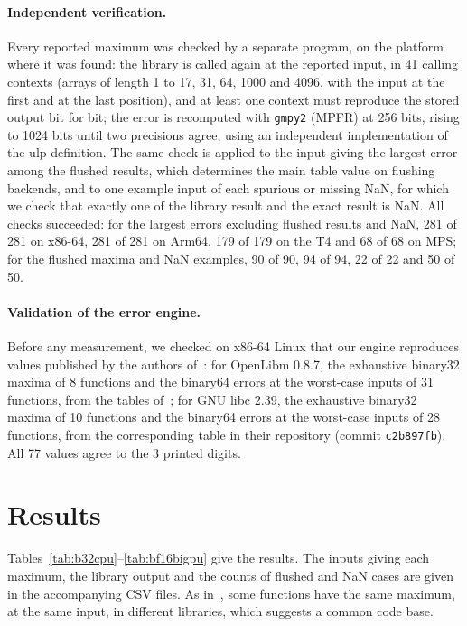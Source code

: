 \documentclass[11pt,a4paper]{article}
\begin{document}
\paragraph{Independent verification.} Every reported maximum was checked by a separate program, on the platform where it was found: the library is called again at the reported input, in 41 calling contexts (arrays of length 1 to 17, 31, 64, 1000 and 4096, with the input at the first and at the last position), and at least one context must reproduce the stored output bit for bit; the error is recomputed with \texttt{gmpy2} (MPFR) at 256 bits, rising to 1024 bits until two precisions agree, using an independent implementation of the ulp definition. The same check is applied to the input giving the largest error among the flushed results, which determines the main table value on flushing backends, and to one example input of each spurious or missing NaN, for which we check that exactly one of the library result and the exact result is NaN. All checks succeeded: for the largest errors excluding flushed results and NaN, 281 of 281 on x86-64, 281 of 281 on Arm64, 179 of 179 on the T4 and 68 of 68 on MPS; for the flushed maxima and NaN examples, 90 of 90, 94 of 94, 22 of 22 and 50 of 50.

\paragraph{Validation of the error engine.} Before any measurement, we checked on x86-64 Linux that our engine reproduces values published by the authors of~\cite{GIMOZ2026}: for OpenLibm 0.8.7, the exhaustive binary32 maxima of 8 functions and the binary64 errors at the worst-case inputs of 31 functions, from the tables of~\cite{GIMOZ2026}; for GNU libc 2.39, the exhaustive binary32 maxima of 10 functions and the binary64 errors at the worst-case inputs of 28 functions, from the corresponding table in their repository (commit \texttt{c2b897fb}). All 77 values agree to the 3 printed digits.

\section{Results}\label{sec:results}

Tables~\ref{tab:b32cpu}--\ref{tab:bf16bigpu} give the results. The inputs giving each maximum, the library output and the counts of flushed and NaN cases are given in the accompanying CSV files. As in~\cite{GIMOZ2026}, some functions have the same maximum, at the same input, in different libraries, which suggests a common code base.
\end{document}
